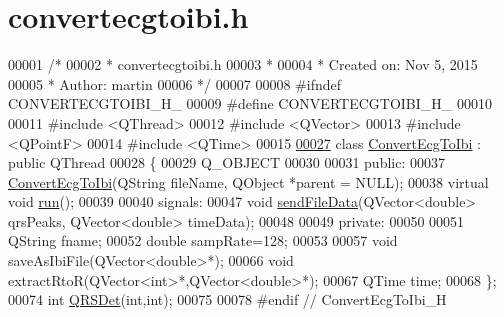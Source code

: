 \hypertarget{convertecgtoibi_8h_source}{}\section{convertecgtoibi.\+h}
\label{convertecgtoibi_8h_source}

\begin{DoxyCode}
00001 \textcolor{comment}{/*}
00002 \textcolor{comment}{ * convertecgtoibi.h}
00003 \textcolor{comment}{ *}
00004 \textcolor{comment}{ *  Created on: Nov 5, 2015}
00005 \textcolor{comment}{ *      Author: martin}
00006 \textcolor{comment}{ */}
00007 
00008 \textcolor{preprocessor}{#ifndef CONVERTECGTOIBI\_H\_}
00009 \textcolor{preprocessor}{#define CONVERTECGTOIBI\_H\_}
00010 
00011 \textcolor{preprocessor}{#include <QThread>}
00012 \textcolor{preprocessor}{#include <QVector>}
00013 \textcolor{preprocessor}{#include <QPointF>}
00014 \textcolor{preprocessor}{#include <QTime>}
00015 
\hypertarget{convertecgtoibi_8h_source.tex_l00027}{}\hyperlink{classConvertEcgToIbi}{00027} \textcolor{keyword}{class }\hyperlink{classConvertEcgToIbi}{ConvertEcgToIbi} : \textcolor{keyword}{public} QThread
00028 \{
00029     Q\_OBJECT
00030 
00031 \textcolor{keyword}{public}:
00037     \hyperlink{classConvertEcgToIbi_add4a7e9eceff1edadcce6e7aa417c05f}{ConvertEcgToIbi}(QString fileName, QObject *parent = NULL);
00038     \textcolor{keyword}{virtual} \textcolor{keywordtype}{void} \hyperlink{classConvertEcgToIbi_a3d9ea57ed19352295382095febc82f71}{run}();
00039 
00040 signals:
00047       \textcolor{keywordtype}{void} \hyperlink{classConvertEcgToIbi_a34d6d61a81e88116c65a2ba9198b7f1c}{sendFileData}(QVector<double> qrsPeaks, QVector<double> timeData);
00048 
00049 \textcolor{keyword}{private}:
00050 
00051     QString fname;
00052     \textcolor{keywordtype}{double} sampRate=128;  
00053 
00057     \textcolor{keywordtype}{void} saveAsIbiFile(QVector<double>*);
00066     \textcolor{keywordtype}{void} extractRtoR(QVector<int>*,QVector<double>*);
00067     QTime time;
00068 \};
00074 \textcolor{keywordtype}{int} \hyperlink{group__HRV-Analysis_ga5c14f0d7dd58dec49e939470bcb5db1c}{QRSDet}(\textcolor{keywordtype}{int},\textcolor{keywordtype}{int});
00075 
00078 \textcolor{preprocessor}{#endif // ConvertEcgToIbi\_H}
\end{DoxyCode}
